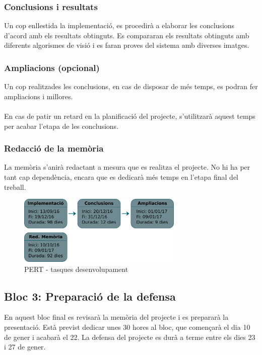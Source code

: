 		\subsubsection{Conclusions i resultats}
			Un cop enllestida la implementació, es procedirà a elaborar les conclusions d'acord amb els resultats obtinguts. Es compararan els resultats obtinguts amb diferents algorismes de visió i es faran
			proves del sistema amb diverses imatges.
		\subsubsection{Ampliacions (opcional)}
			Un cop realitzades les conclusions, en cas de disposar de més temps, es podran fer ampliacions i millores.\\\\
			En cas de patir un retard en la planificació del projecte, s'utilitzarà aquest temps per acabar l'etapa de les conclusions.
		\subsubsection{Redacció de la memòria}
			La memòria s'anirà redactant a mesura que es realitza el projecte. No hi ha per tant cap dependència, encara que es dedicarà més temps en l'etapa final del treball.\\

		\begin{figure}[H]
			\centering
			\includegraphics[width=0.7\textwidth]{images/tasques}
			\caption{PERT - tasques desenvolupament}
		\end{figure}

	\subsection{Bloc 3: Preparació de la defensa}
	En aquest bloc final es revisarà la memòria del projecte i es prepararà la presentació. Està previst dedicar unes 30 hores al bloc, que començarà el dia 10 de gener i acabarà el 22.
	La defensa del projecte es durà a terme entre els dies 23 i 27 de gener.

